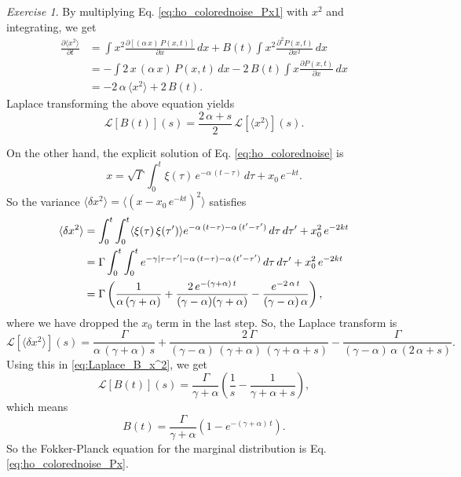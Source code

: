 \documentclass{book}
\numberwithin{equation}{section}
\theoremstyle{plain}
\theoremstyle{definition}
\theoremstyle{remark}
\theoremstyle{BoldStyle}
\newtheorem{exercise}{Exercise}
\numberwithin{exercise}{section}
\begin{document}
\begin{exercise}
{    By multiplying Eq. \eqref{eq:ho_colorednoise_Px1} with $x^2$ and integrating,
    we get
    $$
    \begin{aligned}
    \frac{ \partial \langle x^2 \rangle } { \partial t }
    &=
    \int x^2 \frac{ \partial [(\alpha \, x) \, P(x, t) ] } { \partial x} \, dx
    + B(t) \int x^2 \frac{ \partial^2 P(x, t) } { \partial x^2 } \, dx
    \\
    &=
    -\int 2 \, x \, (\alpha \, x) \, P(x, t) \, dx
    - 2 \, B(t) \int x \frac{ \partial P(x, t) } { \partial x } \, dx
    \\
    &=
    - 2 \, \alpha \, \langle x^2 \rangle
    + 2 \, B(t).
    \end{aligned}
    $$
    Laplace transforming the above equation yields
    \begin{equation}
    \mathcal L[ B(t) ](s) = \frac{2 \, \alpha + s}{2} \, \mathcal L[\langle x^2 \rangle](s).
    \label{eq:Laplace_B_x^2}
    \end{equation}

    On the other hand,
    the explicit solution of Eq. \eqref{eq:ho_colorednoise} is
    $$
    x = \sqrt{\Gamma} \int_0^t \xi(\tau) \, e^{-\alpha \, (t-\tau)}  \, d\tau
      + x_0 \, e^{-kt}.
    $$
    So the variance $\langle \delta x^2 \rangle = \langle (x - x_0 \, e^{-kt})^2 \rangle$
    satisfies
    \begin{align}
    \langle \delta x^2 \rangle
    &=
    \int_0^t\int_0^t \langle \xi(\tau) \, \xi(\tau') \rangle
    e^{-\alpha \, (t-\tau)- \alpha \, (t'-\tau')} \, d\tau \, d\tau'
    +
    x_0^2 \, e^{-2kt}
    \notag \\
    &=
    \Gamma \int_0^t\int_0^t
    e^{-\gamma|\tau - \tau'|-\alpha \, (t-\tau) - \alpha \, (t'-\tau')} \, d\tau \, d\tau'
    +
    x_0^2 \, e^{-2kt}
    \notag \\
    &=
    \Gamma
    \left(
      \frac{1}{\alpha \,(\gamma + \alpha) }
      +
      \frac{2 \, e^{-(\gamma + \alpha) \, t} }{(\gamma - \alpha) (\gamma + \alpha) }
      -
      \frac{e^{-2 \, \alpha \, t} }{(\gamma - \alpha) \, \alpha }
    \right),
    \label{eq:ho_colorednoise_var}
    \end{align}
    where we have dropped the $x_0$ term in the last step.
    So, the Laplace transform is
    $$
    \mathcal L[\langle \delta x^2 \rangle](s)
    =
      \frac{ \Gamma } { \alpha \, (\gamma + \alpha) \, s }
      +
      \frac{ 2 \, \Gamma } { (\gamma - \alpha) \, (\gamma + \alpha) \, (\gamma + \alpha + s) }
      -
      \frac{ \Gamma } { (\gamma - \alpha ) \, \alpha \, (2 \, \alpha + s) }.
    $$
    Using this in \eqref{eq:Laplace_B_x^2}, we get
    $$
    \mathcal L[B(t)](s) =
      \frac{ \Gamma }{ \gamma + \alpha }
      \left( \frac{1}{s} - \frac{1}{ \gamma + \alpha + s } \right),
    $$
    which means
    $$
    B(t) = \frac{ \Gamma } { \gamma + \alpha } \left( 1 - e^{-(\gamma + \alpha) \,t} \right).
    $$
    So the Fokker-Planck equation for the marginal distribution is
    Eq. \eqref{eq:ho_colorednoise_Px}.
  }


\end{exercise}
\end{document}
